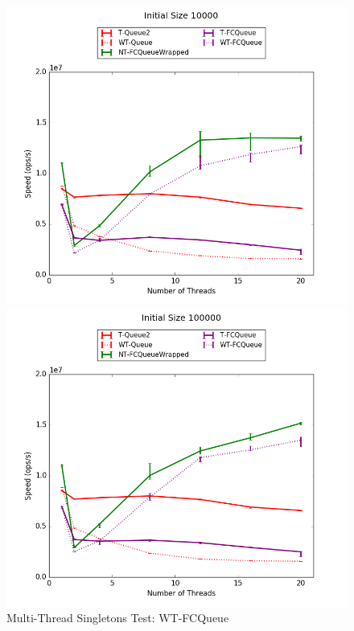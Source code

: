 \begin{figure}[H]
    \centering
	\begin{minipage}{0.5\textwidth}\includegraphics[width=\textwidth]{fcqueues/lpQ:RandSingleOps10000.png}
    \end{minipage}
	\begin{minipage}{0.45\textwidth}
    
    \end{minipage}
	\begin{minipage}{0.5\textwidth}\includegraphics[width=\textwidth]{fcqueues/lpQ:RandSingleOps100000.png}
    \end{minipage}
	\begin{minipage}{0.45\textwidth}
    
    \end{minipage}
\caption{Multi-Thread Singletons Test: WT-FCQueue}
\label{fig:wtqueues}
\end{figure}
